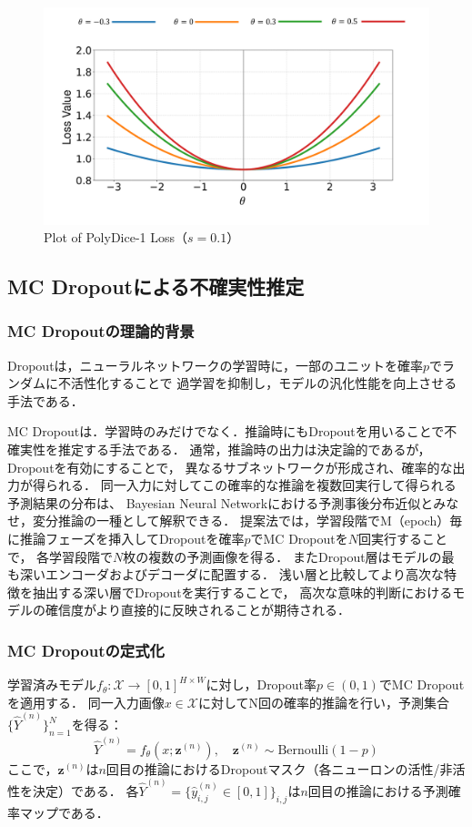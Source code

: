 \documentclass[10pt, a4paper, twocolumn]{jarticle}
\begin{document}
\begin{figure}
  \includegraphics[scale=0.25]{figure/loss.pdf}
  \caption{Plot of PolyDice-1 Loss（$s = 0.1$）}
  \label{polydice}
\end{figure}

\subsection{MC Dropoutによる不確実性推定}

\subsubsection{MC Dropoutの理論的背景}

Dropoutは，ニューラルネットワークの学習時に，一部のユニットを確率$p$でランダムに不活性化することで
過学習を抑制し，モデルの汎化性能を向上させる手法である．

MC Dropoutは．学習時のみだけでなく．推論時にもDropoutを用いることで不確実性を推定する手法である．
通常，推論時の出力は決定論的であるが，Dropoutを有効にすることで，
異なるサブネットワークが形成され、確率的な出力が得られる．
同一入力に対してこの確率的な推論を複数回実行して得られる予測結果の分布は、
Bayesian Neural Networkにおける予測事後分布近似とみなせ，変分推論の一種として解釈できる．
提案法では，学習段階でM（epoch）毎に推論フェーズを挿入してDropoutを確率$p$でMC Dropoutを$N$回実行することで，
各学習段階で$N$枚の複数の予測画像を得る．
またDropout層はモデルの最も深いエンコーダおよびデコーダに配置する．
浅い層と比較してより高次な特徴を抽出する深い層でDropoutを実行することで，
高次な意味的判断におけるモデルの確信度がより直接的に反映されることが期待される．

\subsubsection{MC Dropoutの定式化}
学習済みモデル$f_{\theta}: \mathcal{X} \rightarrow [0,1]^{H \times W}$に対し，Dropout率$p \in (0,1)$でMC Dropoutを適用する．
同一入力画像$x \in \mathcal{X}$に対してN回の確率的推論を行い，予測集合$\{\hat{Y}^{(n)}\}_{n=1}^{N}$を得る：
%
\begin{equation}
  \hat{Y}^{(n)} = f_{\theta}(x; \mathbf{z}^{(n)}), \quad \mathbf{z}^{(n)} \sim \text{Bernoulli}(1-p)
\end{equation}
%
ここで，$\mathbf{z}^{(n)}$は$n$回目の推論におけるDropoutマスク（各ニューロンの活性/非活性を決定）である．
各$\hat{Y}^{(n)} = \{\hat{y}_{i,j}^{(n)} \in [0,1]\}_{i,j}$は$n$回目の推論における予測確率マップである．
\end{document}
